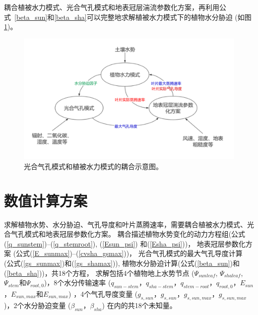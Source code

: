 耦合植被水力模式、光合气孔模式和地表冠层湍流参数化方案，再利用公式~\eqref{beta_sun}和\eqref{beta_sha}可以完整地求解植被水力模式下的植物水分胁迫 (如图 \ref{fig:光合气孔模式和植被水力模式的耦合示意图})。
{
    \begin{figure}[htbp]
    \centering
    \includegraphics{Figures/植被水力模式/光合气孔模式和植被水力模式的耦合示意图.png}
    \caption{光合气孔模式和植被水力模式的耦合示意图。}
    \label{fig:光合气孔模式和植被水力模式的耦合示意图}
    \end{figure}
}


\section{数值计算方案}\label{数值计算方案}
求解植物水势、水分胁迫、气孔导度和叶片蒸腾速率，需要耦合植被水力模式、光合气孔模式和地表冠层参数化方案。
耦合描述植物水势变化的动力方程组(公式(\ref{q_sunstem})--(\ref{q_stemroot}), (\ref{Esun_psi}) 和(\ref{Esha_psi}))，
地表冠层参数化方案 (公式(\ref{E_sunmax})--(\ref{cvsha_gsmax}))，
光合气孔模式的最大气孔导度计算 (公式(\ref{gs_sunmax})和(\ref{gs_shamax})), 植物水分胁迫计算(公式(\ref{beta_sun})和(\ref{beta_sha}))，共18个方程，
求解包括4个植物地上水势节点 ($\Psi_{sunleaf}$, $\Psi_{shaleaf}$, $\Psi_{stem}$和$\Psi_{root,0}$)，8个水分传输速率 
($q_{sun-stem}$，$q_{sha-stem}$，$q_{stem-root}$，$q_{root,0}$，$E_{sun}$，$E_{sun,max}$和$E_{sun,max}$) ，4个气孔导度变量
 ($g_{s,sun}$，$g_{s,sun}$，$g_{s,sun,max}$，$g_{s,sun,max}$)，2个水分胁迫变量 ($\beta_{sun}$，$\beta_{sha}$) 在内的共18个未知量。

